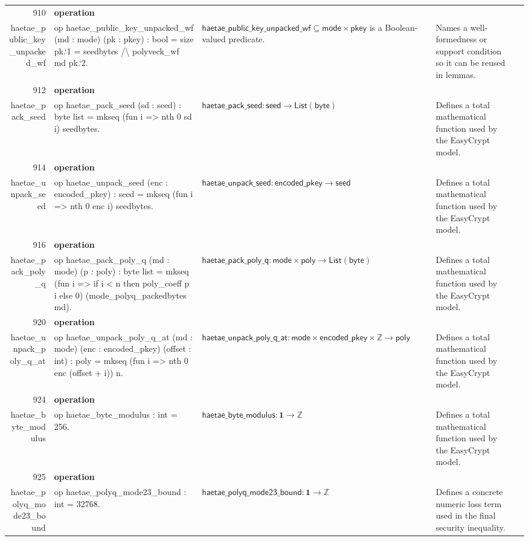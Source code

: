 \documentclass[10pt]{article}
\newcommand{\ec}[1]{\begingroup\ttfamily\scriptsize #1\endgroup}
\begin{document}
\begin{longtable}{r L{0.17\textwidth} L{0.26\textwidth} L{0.27\textwidth} L{0.20\textwidth}}
910 & \textbf{operation}\\\ec{haetae\_public\_key\_unpacked\_wf} & \ec{op haetae\_public\_key\_unpacked\_wf (md : mode) (pk : pkey) : bool = size pk.`1 = seedbytes /\textbackslash{} polyveck\_wf md pk.`2.} & \(\mathsf{haetae\_public\_key\_unpacked\_wf} \subseteq \mathsf{mode} \times \mathsf{pkey}\) is a Boolean-valued predicate. & Names a well-formedness or support condition so it can be reused in lemmas. \\
912 & \textbf{operation}\\\ec{haetae\_pack\_seed} & \ec{op haetae\_pack\_seed (sd : seed) : byte list = mkseq (fun i => nth 0 sd i) seedbytes.} & \(\mathsf{haetae\_pack\_seed} : \mathsf{seed} \to \mathsf{List}(\mathsf{byte})\) & Defines a total mathematical function used by the EasyCrypt model. \\
914 & \textbf{operation}\\\ec{haetae\_unpack\_seed} & \ec{op haetae\_unpack\_seed (enc : encoded\_pkey) : seed = mkseq (fun i => nth 0 enc i) seedbytes.} & \(\mathsf{haetae\_unpack\_seed} : \mathsf{encoded\_pkey} \to \mathsf{seed}\) & Defines a total mathematical function used by the EasyCrypt model. \\
916 & \textbf{operation}\\\ec{haetae\_pack\_poly\_q} & \ec{op haetae\_pack\_poly\_q (md : mode) (p : poly) : byte list = mkseq (fun i => if i < n then poly\_coeff p i else 0) (mode\_polyq\_packedbytes md).} & \(\mathsf{haetae\_pack\_poly\_q} : \mathsf{mode} \times \mathsf{poly} \to \mathsf{List}(\mathsf{byte})\) & Defines a total mathematical function used by the EasyCrypt model. \\
920 & \textbf{operation}\\\ec{haetae\_unpack\_poly\_q\_at} & \ec{op haetae\_unpack\_poly\_q\_at (md : mode) (enc : encoded\_pkey) (offset : int) : poly = mkseq (fun i => nth 0 enc (offset + i)) n.} & \(\mathsf{haetae\_unpack\_poly\_q\_at} : \mathsf{mode} \times \mathsf{encoded\_pkey} \times \mathbb{Z} \to \mathsf{poly}\) & Defines a total mathematical function used by the EasyCrypt model. \\
924 & \textbf{operation}\\\ec{haetae\_byte\_modulus} & \ec{op haetae\_byte\_modulus : int = 256.} & \(\mathsf{haetae\_byte\_modulus} : \mathbf{1} \to \mathbb{Z}\) & Defines a total mathematical function used by the EasyCrypt model. \\
925 & \textbf{operation}\\\ec{haetae\_polyq\_mode23\_bound} & \ec{op haetae\_polyq\_mode23\_bound : int = 32768.} & \(\mathsf{haetae\_polyq\_mode23\_bound} : \mathbf{1} \to \mathbb{Z}\) & Defines a concrete numeric loss term used in the final security inequality. \\

\end{longtable}
\end{document}
